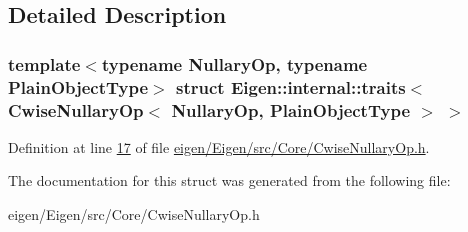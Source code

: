 \subsection{Detailed Description}
\subsubsection*{template$<$typename Nullary\+Op, typename Plain\+Object\+Type$>$\newline
struct Eigen\+::internal\+::traits$<$ Cwise\+Nullary\+Op$<$ Nullary\+Op, Plain\+Object\+Type $>$ $>$}



Definition at line \hyperlink{eigen_2_eigen_2src_2_core_2_cwise_nullary_op_8h_source_l00017}{17} of file \hyperlink{eigen_2_eigen_2src_2_core_2_cwise_nullary_op_8h_source}{eigen/\+Eigen/src/\+Core/\+Cwise\+Nullary\+Op.\+h}.



The documentation for this struct was generated from the following file\+:\begin{DoxyCompactItemize}
\item 
eigen/\+Eigen/src/\+Core/\+Cwise\+Nullary\+Op.\+h\end{DoxyCompactItemize}
